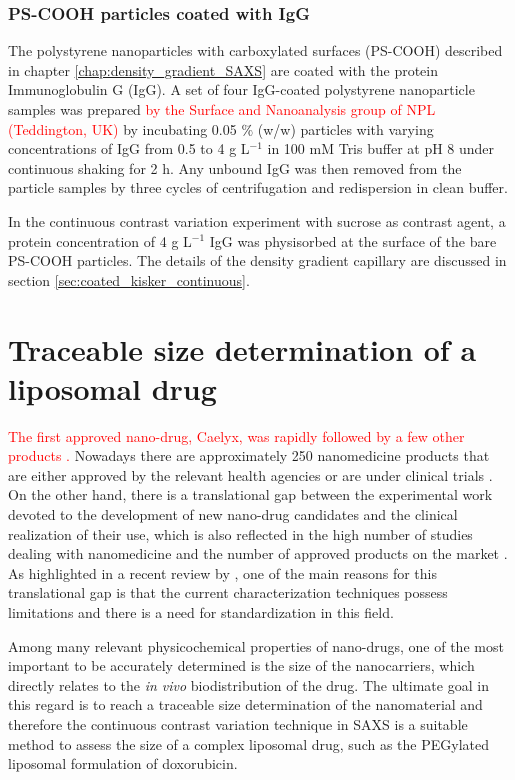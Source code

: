 \subsubsection{PS-COOH particles coated with IgG}

The polystyrene nanoparticles with carboxylated surfaces (PS-COOH) described in chapter \ref{chap:density_gradient_SAXS} are coated with the protein Immunoglobulin G (IgG). A set of four IgG-coated polystyrene nanoparticle samples was prepared \textcolor{red}{by the Surface and Nanoanalysis group of NPL (Teddington, UK)} by incubating 0.05 $\%$ (w/w) particles with varying concentrations of IgG from 0.5 to 4 g L$^{-1}$ in 100 mM Tris buffer at pH 8 under continuous shaking for 2 h. Any unbound IgG was then removed from the particle samples by three cycles of centrifugation and redispersion in clean buffer.

In the continuous contrast variation experiment with sucrose as contrast agent, a protein concentration of 4 g L$^{-1}$ IgG was physisorbed at the surface of the bare PS-COOH particles. The details of the density gradient capillary are discussed in section \ref{sec:coated_kisker_continuous}.

\section{Traceable size determination of a liposomal drug}
\label{sec:caelyx_size}

\textcolor{red}{The first approved nano-drug, Caelyx, was rapidly followed by a few other products \citep{yeh_clinical_2011,barenholz_doxil-first_2012}.} Nowadays there are approximately 250 nanomedicine products that are either approved by the relevant health agencies or are under clinical trials \citep{etheridge_big_2013}. On the other hand, there is a translational gap between the experimental work devoted to the development of new nano-drug candidates and the clinical realization of their use, which is also reflected in the high number of studies dealing with nanomedicine and the number of approved products on the market \citep{venditto_cancer_2013}. As highlighted in a recent review by \cite{khorasani_closing_2014}, one of the main reasons for this translational gap is that the current characterization techniques possess limitations and there is a need for standardization in this field.

Among many relevant physicochemical properties of nano-drugs, one of the most important to be accurately determined is the size of the nanocarriers, which directly relates to the \emph{in vivo} biodistribution of the drug. The ultimate goal in this regard is to reach a traceable size determination of the nanomaterial and therefore the continuous contrast variation technique in SAXS is a suitable method to assess the size of a complex liposomal drug, such as the PEGylated liposomal formulation of doxorubicin. 


